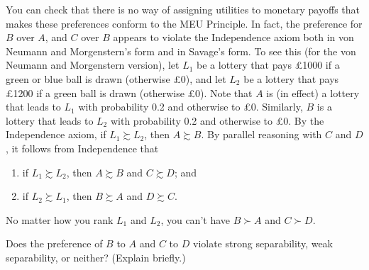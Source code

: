 You can  check that there is no way of assigning utilities to
monetary payoffs that makes these preferences conform to the MEU
Principle. In fact, the preference for $B$ over $A$, and $C$ over $B$
appears to violate the Independence axiom both in von Neumann and
Morgenstern's form and in Savage's form. To see this (for the von
Neumann and Morgenstern version), let $L_1$ be a lottery that pays
£1000 if a green or blue ball is drawn (otherwise £0), and let $L_2$
be a lottery that pays £1200 if a green ball is drawn (otherwise
£0). Note that $A$ is (in effect) a lottery that leads to $L_1$ with
probability 0.2 and otherwise to £0. Similarly, $B$ is a lottery that
leads to $L_2$ with probability 0.2 and otherwise to £0. By the
Independence axiom, if $L_1 \succsim L_2$, then $A \succsim B$. By
parallel reasoning with $C$ and $D$, it follows from Independence that
\begin{enumerate}
  \itemsep0em 
\item if $L_1 \succsim L_2$, then $A \succsim B$ and $C \succsim D$; and
\item if $L_2 \succsim L_1$, then $B \succsim A$ and $D \succsim C$.
\end{enumerate}
No matter how you rank $L_1$ and $L_2$, you can't have $B \succ A$ and $C \succ D$.

\begin{exercise2}
  Does the preference of $B$ to $A$ and $C$ to $D$ violate strong
  separability, weak separability, or neither? (Explain briefly.)
\end{exercise2}


